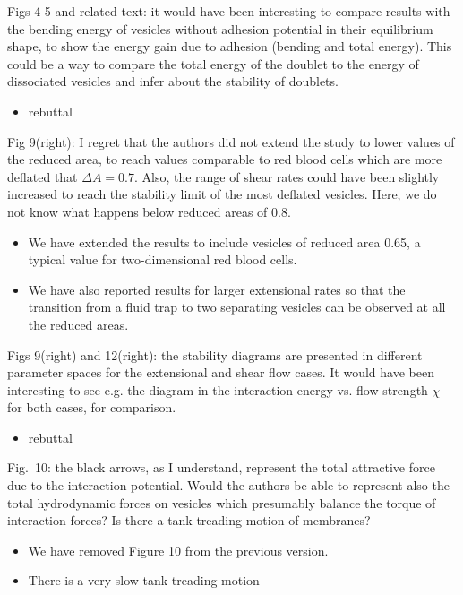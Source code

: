 \documentclass[11pt]{article}
\newcommand{\comment}[1]{{\color{blue} #1}}
\begin{document}
\noindent
\comment{Figs 4-5 and related text: it would have been interesting to
compare results with the bending energy of vesicles without adhesion
potential in their equilibrium shape, to show the energy gain due to
adhesion (bending and total energy). This could be a way to compare
the total energy of the doublet to the energy of dissociated vesicles
and infer about the stability of doublets.}
\begin{itemize}
  \item rebuttal
\end{itemize}

\noindent
\comment{Fig 9(right): I regret that the authors did not extend the study
to lower values of the reduced area, to reach values comparable to red
blood cells which are more deflated that $\Delta A=0.7$. Also, the range
of shear rates could have been slightly increased to reach the
stability limit of the most deflated vesicles. Here, we do not know
what happens below reduced areas of 0.8.}
\begin{itemize}
  \item We have extended the results to include vesicles of reduced area
    0.65, a typical value for two-dimensional red blood cells.
  \item We have also reported results for larger extensional rates so
    that the transition from a fluid trap to two separating vesicles can
    be observed at all the reduced areas.
\end{itemize}

\noindent
\comment{ Figs 9(right) and 12(right): the stability diagrams are presented
in different parameter spaces for the extensional and shear flow
cases. It would have been interesting to see e.g. the diagram in the
interaction energy vs. flow strength $\chi$ for both cases, for
comparison.}
\begin{itemize}
  \item rebuttal
\end{itemize}

\noindent
\comment{Fig.~10: the black arrows, as I understand, represent the total
attractive force due to the interaction potential. Would the authors
be able to represent also the total hydrodynamic forces on vesicles
which presumably balance the torque of interaction forces? Is there a
tank-treading motion of membranes?}
\begin{itemize}
  \item We have removed Figure 10 from the previous version.

  \item There is a very slow tank-treading motion 
\end{itemize}
\end{document}
